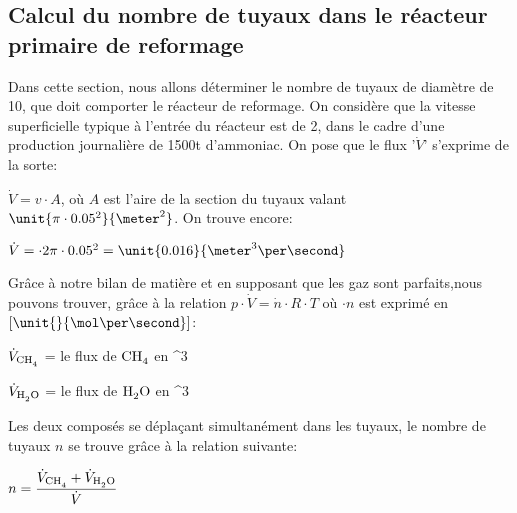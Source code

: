 \documentclass{article}
\begin{document}
\subsection{Calcul du nombre de tuyaux dans le réacteur primaire de reformage}

Dans cette section, nous allons déterminer le nombre de tuyaux de diamètre de \unit{10}{\centi\meter}, que doit comporter le réacteur de reformage. On considère que la vitesse superficielle typique à l'entrée du réacteur est de \unit{2}{\meter\per\second}, dans le cadre d'une production journalière de \unit{1500}{t} d'ammoniac. On pose que le flux '$\dot{V}$' s'exprime de la sorte:

$\dot{V} = v \cdot A$, où $A$ est l'aire de la section du tuyaux valant $\unit{\pi \cdot 0.05^2}{\meter ^2}$. On trouve encore:

$\dot{V} = \cdot 2 \pi \cdot 0.05^2 = \unit{0.016}{\meter ^3 \per\second}$

Grâce à notre bilan de matière et en supposant que les gaz sont parfaits,nous pouvons trouver, grâce à la relation $p\cdot \dot{V}=\dot{n} \cdot R\cdot T$
où $\cdot{n}$ est exprimé en $[\unit{}{\mol \per\second}]$:

$\dot{V}_{\ce{CH_4}}$ = le flux de $\ce{CH_4}$ en \unit{}{\meter ^3 \per\second}

$\dot{V}_{\ce{H_2O}}$ = le flux de $\ce{H_2O}$ en \unit{}{\meter ^3 \per\second}

Les deux composés se déplaçant simultanément dans les tuyaux, le nombre de tuyaux $n$ se trouve grâce à la relation suivante:

$n = \dfrac{\dot{V}_{\ce{CH_4}} + \dot{V}_{\ce{H_2O}}}{\dot{V}}$
\end{document}
